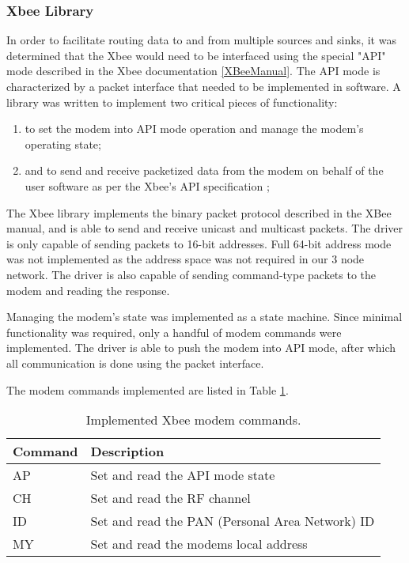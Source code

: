 \subsubsection{Xbee Library}

In order to facilitate routing data to and from multiple sources and sinks, it was determined that the Xbee would need to be interfaced using the special "API" mode described in the Xbee documentation \ref{XBeeManual}. The API mode is characterized by a packet interface that needed to be implemented in software. A library was written to implement two critical pieces of functionality:

\begin{enumerate}
\item to set the modem into API mode operation and manage the modem's operating state;
\item and to send and receive packetized data from the modem on behalf of the user software as per the Xbee's API specification \cite{XBeeManual};
\end{enumerate}

The Xbee library implements the binary packet protocol described in the XBee manual, and is able to send and receive unicast and multicast packets. The driver is only capable of sending packets to 16-bit addresses. Full 64-bit address mode was not implemented as the address space was not required in our 3 node network. The driver is also capable of sending command-type packets to the modem and reading the response.

Managing the modem's state was implemented as a state machine. Since minimal functionality was required, only a handful of modem commands were implemented. The driver is able to push the modem into API mode, after which all communication is done using the packet interface.

The modem commands implemented are listed in Table \ref{tab:xbee_commands}.

\begin{table}
\caption{Implemented Xbee modem commands.\label{tab:xbee_commands}}
\centering{}
\begin{tabular}{|l|l|}
\hline 
Command & Description \tabularnewline
\hline
\hline
AP & Set and read the API mode state \tabularnewline
\hline
CH & Set and read the RF channel \tabularnewline
\hline 
ID & Set and read the PAN (Personal Area Network) ID \tabularnewline
\hline
MY & Set and read the modems local address \tabularnewline
\hline
\end{tabular}
\end{table}

